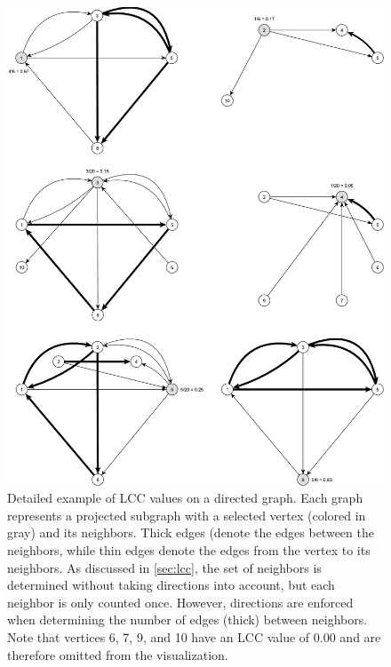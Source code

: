 \begin{figure}[h]
	\centering
	\includegraphics[scale=\examplescale]{figures/examples/lcc-dir-example-detailed.pdf}
	\caption{Detailed example of LCC values on a directed graph. Each graph represents a projected subgraph with a selected vertex (colored in gray) and its neighbors.
		Thick edges (denote the edges between the neighbors, while thin edges denote the edges from the vertex to its neighbors.
		As discussed in \autoref{sec:lcc}, the set of neighbors is determined without taking directions into account, but each neighbor is only counted once. However, directions are enforced when determining the number of edges (thick) between neighbors.
		Note that vertices 6, 7, 9, and 10 have an LCC value of 0.00 and are therefore omitted from the visualization.}
	\label{fig:lcc_dir_example_detailed}
\end{figure}

